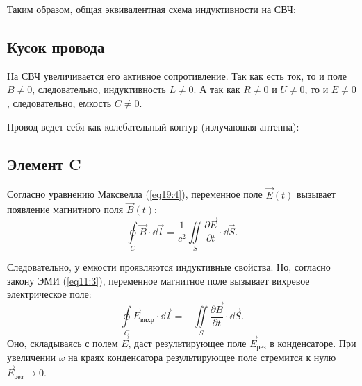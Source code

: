         Таким образом, общая эквивалентная схема индуктивности на СВЧ:
    
    \subsection{Кусок провода}
        На СВЧ увеличивается его активное сопротивление. Так как есть ток, то и
        поле \( B \ne 0 \), следовательно, индуктивность \( L \ne 0 \). А так
        как \( R \ne 0 \) и \( U \ne 0 \), то и \( E \ne 0 \), следовательно,
        емкость \( C \ne 0 \).
         
        Провод ведет себя как колебательный контур (излучающая антенна):
    
    \subsection{Элемент C}
    
        Согласно уравнению Максвелла (\ref{eq19:4}), переменное поле
        \( \vec{E}(t) \) вызывает появление магнитного поля \( \vec{B}(t) \):
        \[
            \oint\limits_C \vec{B}\cdot\dd\vec{l} =
            \frac{1}{c^2}\iint\limits_S \frac{\partial \vec{E}}{\partial t}
            \cdot\dd\vec{S}.
        \]
        
        Следовательно, у емкости проявляются индуктивные свойства. Но, согласно
        закону ЭМИ (\ref{eq11:3}), переменное магнитное поле вызывает вихревое
        электрическое поле:
        \[
            \oint\limits_C \vec{E}_{\textit{вихр}}\cdot\dd\vec{l} =
            -\iint\limits_S \frac{\partial \vec{B}}{\partial t}\cdot\dd\vec{S}.
        \]
        Оно, складываясь с полем \( \vec{E} \), даст результирующее поле 
        \( \vec{E}_{\textit{рез}} \) в конденсаторе. При увеличении \( \omega \)
        на краях конденсатора результирующее поле стремится к нулю
        \( \vec{E}_{\textit{рез}} \to 0 \).
